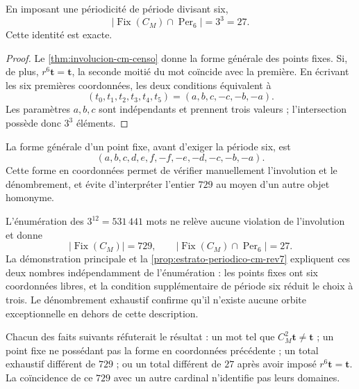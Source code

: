 \begin{proposition}
\label{prop:estrato-periodico-cm-rev7} En imposant une périodicité de période divisant six,
\[
 \bigl|\operatorname{Fix}(C_M)\cap\operatorname{Per}_6\bigr|
 =3^3=27.
\]
Cette identité est exacte.
\end{proposition}

\begin{proof}
Le \cref{thm:involucion-cm-censo} donne la forme générale des points fixes. Si, de plus, \(r^6\mathbf t=\mathbf t\), la seconde moitié du mot coïncide avec la première. En écrivant les six premières coordonnées, les deux conditions équivalent à
\[
 (t_0,t_1,t_2,t_3,t_4,t_5)
 =(a,b,c,-c,-b,-a).
\]
Les paramètres \(a,b,c\) sont indépendants et prennent trois valeurs ; l’intersection possède donc \(3^3\) éléments.
\end{proof}

La forme générale d’un point fixe, avant d’exiger la période six, est
\[
 (a,b,c,d,e,f,-f,-e,-d,-c,-b,-a).
\]
Cette forme en coordonnées permet de vérifier manuellement l’involution et le dénombrement, et évite d’interpréter l’entier \(729\) au moyen d’un autre objet homonyme.

\begin{remark}
\label{rem:procedencia-n40-cm} L’énumération des \(3^{12}=531\,441\) mots ne relève aucune violation de l’involution et donne
\[
 |\operatorname{Fix}(C_M)|=729,
 \qquad
 |\operatorname{Fix}(C_M)\cap\operatorname{Per}_6|=27.
\]
La démonstration principale et la \cref{prop:estrato-periodico-cm-rev7} expliquent ces deux nombres indépendamment de l’énumération : les points fixes ont six coordonnées libres, et la condition supplémentaire de période six réduit le choix à trois. Le dénombrement exhaustif confirme qu’il n’existe aucune orbite exceptionnelle en dehors de cette description.
\end{remark}

\begin{criterion} \label{crit:falsadores-cm} Chacun des faits suivants réfuterait le résultat : un mot tel que \(C_M^2\mathbf t\ne\mathbf t\) ; un point fixe ne possédant pas la forme en coordonnées précédente ; un total exhaustif différent de \(729\) ; ou un total différent de \(27\) après avoir imposé \(r^6\mathbf t=\mathbf t\). La coïncidence de ce \(729\) avec un autre cardinal n’identifie pas leurs domaines.
\end{criterion}

